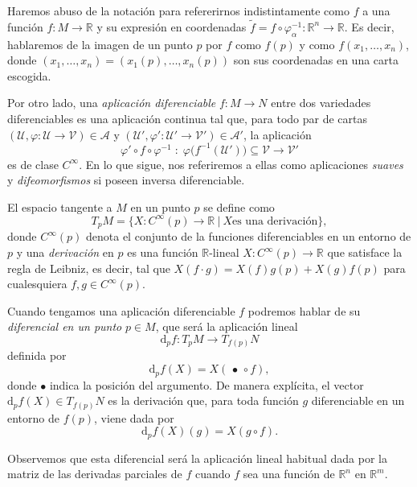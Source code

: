 Haremos abuso de la notación para refererirnos indistintamente como $f$ a una función $f:M\to \mathbb{R}$ y su expresión en coordenadas $\tilde{f} = f\circ\varphi_{\alpha}^{-1} : \mathbb{R}^n \to \mathbb{R}$. Es decir, hablaremos de la imagen de un punto $p$ por $f$ como $f(p)$ y como $f(x_1,\dots,x_n)$, donde $(x_1,\dots,x_n)=(x_1(p),\dots,x_n(p))$ son sus coordenadas en una carta escogida. 

\bigskip

Por otro lado, una \textit{aplicación diferenciable} $f \colon M \to N$ entre dos variedades diferenciables es una aplicación continua tal que, para todo par de cartas
$(\mathcal{U},\varphi \colon \mathcal{U} \to \mathcal{V}) \in \mathcal{A}$ y $(\mathcal{U}',\varphi' \colon \mathcal{U}' \to \mathcal{V}') \in \mathcal{A}'$, la aplicación
\[
\varphi' \circ f \circ \varphi^{-1}
\;:\;
\varphi\bigl(f^{-1}(\mathcal{U}')\bigr) \subseteq \mathcal{V}
\longrightarrow \mathcal{V}'
\]
es de clase $C^\infty$. En lo que sigue, nos referiremos a ellas como aplicaciones \textit{suaves} y \textit{difeomorfismos} si poseen inversa diferenciable.

\bigskip

El espacio tangente a $M$ en un punto $p$ se define como
\begin{equation*}
  T_pM=\{X:C^{\infty}(p)\to \mathbb{R} ~|~ X \text{es una derivación} \},
\end{equation*}
donde $C^{\infty}(p)$ denota el conjunto de la funciones diferenciables en un entorno de $p$ y una \textit{derivación} en $p$ es una función $\mathbb{R}$-lineal $X:C^{\infty}(p)\to\mathbb{R}$ que satisface la regla de Leibniz, es decir, tal que $X(f\cdot g)=X(f)g(p) + X(g)f(p)$ para cualesquiera $f,g\in C^{\infty}(p)$.

Cuando tengamos una aplicación diferenciable $f$ podremos hablar de su \textit{diferencial en un punto} $p \in M$, que será la aplicación lineal
\[
\mathrm d_p f \colon T_p M \longrightarrow T_{f(p)} N
\]
definida por
\[
\mathrm d_p f(X) = X(\,\bullet\, \circ f),
\]
donde $\bullet$ indica la posición del argumento. De manera explícita, el vector $\mathrm d_p f(X) \in T_{f(p)}N$ es la derivación  que, para toda función $g$ diferenciable en un entorno de $f(p)$, viene dada por
\[
\mathrm d_p f(X)(g) = X(g \circ f).
\]

Observemos que esta diferencial será la aplicación lineal habitual dada por la matriz de las derivadas parciales de $f$ cuando $f$ sea una función de $\mathbb{R}^n$ en $\mathbb{R}^m$.

